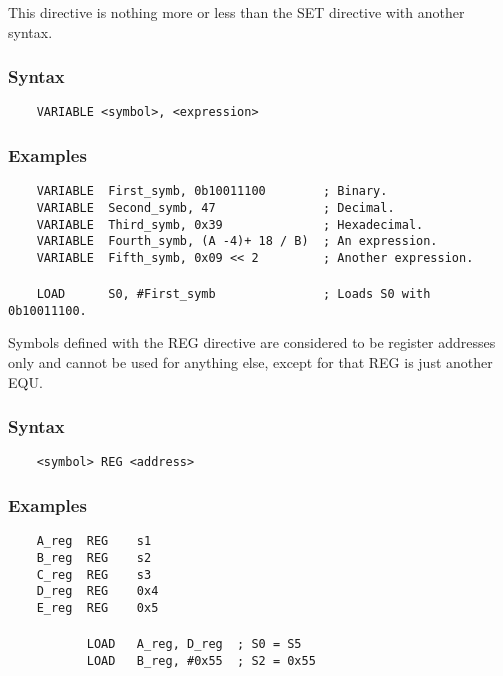     This directive is nothing more or less than the SET directive with another syntax.

    \subsubsection{Syntax}
        \verb'    VARIABLE <symbol>, <expression>'

    \subsubsection{Examples}
        \verb'    VARIABLE  First_symb, 0b10011100        ; Binary.'\\
        \verb'    VARIABLE  Second_symb, 47               ; Decimal.'\\
        \verb'    VARIABLE  Third_symb, 0x39              ; Hexadecimal.'\\
        \verb'    VARIABLE  Fourth_symb, (A -4)+ 18 / B)  ; An expression.'\\
        \verb'    VARIABLE  Fifth_symb, 0x09 << 2         ; Another expression.'\\
        \verb''\\
        \verb'    LOAD      S0, #First_symb               ; Loads S0 with 0b10011100.'

    Symbols defined with the REG directive are considered to be register addresses only and cannot be used for anything else, except for that REG is just another EQU.

    \subsubsection{Syntax}
        \verb'    <symbol> REG <address>'

    \subsubsection{Examples}
        \verb'    A_reg  REG    s1'\\
        \verb'    B_reg  REG    s2'\\
        \verb'    C_reg  REG    s3'\\
        \verb'    D_reg  REG    0x4'\\
        \verb'    E_reg  REG    0x5'\\
        \verb''\\
        \verb'           LOAD   A_reg, D_reg  ; S0 = S5'\\
        \verb'           LOAD   B_reg, #0x55  ; S2 = 0x55'

